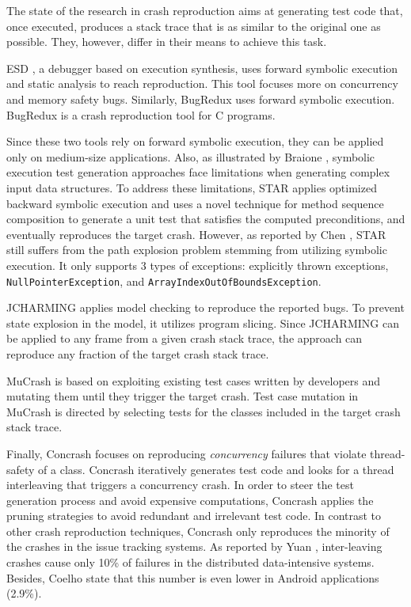 The state of the research in crash reproduction \cite{Zamfir2010, jin2012bugredux, BPT17concrash, soltani2017, Nayrolles2017, Xuan2015, Chen2015} aims at generating test code that, once executed, produces a stack trace that is as similar to the original one as possible. They, however, differ in their means to achieve this task. 

\textrm{ESD} \cite{Zamfir2010}, a debugger based on execution synthesis, uses forward symbolic execution and static analysis to reach reproduction. This tool focuses more on concurrency and memory safety bugs.
Similarly, \textrm{BugRedux} \cite{jin2012bugredux} uses forward symbolic execution. \textrm{BugRedux} is a crash reproduction tool for C programs.

Since these two tools rely on forward symbolic execution, they can be applied only on medium-size applications. Also, as illustrated by Braione \etal \cite{braione2017tardis}, symbolic execution test generation approaches face limitations when generating complex input data structures.
To address these limitations, \textrm{STAR} \cite{Chen2015} applies optimized backward symbolic execution and uses a novel technique for method sequence composition to generate a unit test that satisfies the computed preconditions, and eventually reproduces the target crash. 
However, as reported by Chen \etal \cite{Chen2015}, \textrm{STAR} still suffers from the path explosion problem stemming from utilizing symbolic execution. 
It only supports 3 types of exceptions: explicitly thrown exceptions, \texttt{NullPointerException}, and \texttt{ArrayIndexOutOfBoundsException}.  

\textrm{JCHARMING} \cite{Nayrolles2017} applies model checking to reproduce the reported bugs. To prevent state explosion in the model, it utilizes program slicing.
Since \textrm{JCHARMING} can be applied to any frame from a given crash stack trace, the approach can reproduce any fraction of the target crash stack trace. 

\textrm{MuCrash} \cite{Xuan2015} is based on exploiting existing test cases written by developers and mutating them until they trigger the target crash.
Test case mutation in \textrm{MuCrash} is directed by selecting tests for the classes included in the target crash stack trace. 

Finally, \textrm{Concrash} \cite{BPT17concrash} focuses on reproducing \textit{concurrency} failures that violate thread-safety of a class.
\textrm{Concrash} iteratively generates test code and looks for a thread interleaving that triggers a concurrency crash.
In order to steer the test generation process and avoid expensive computations, \textrm{Concrash} applies the pruning strategies to avoid redundant and irrelevant test code. In contrast to other crash reproduction techniques, \textrm{Concrash} only reproduces the minority of the crashes in the issue tracking systems. As reported by Yuan \etal \cite{Yuan2014}, inter-leaving crashes cause only 10\% of failures in the distributed data-intensive systems. Besides, Coelho \etal \cite{Coelho2015} state that this number is even lower in Android applications (2.9\%).

